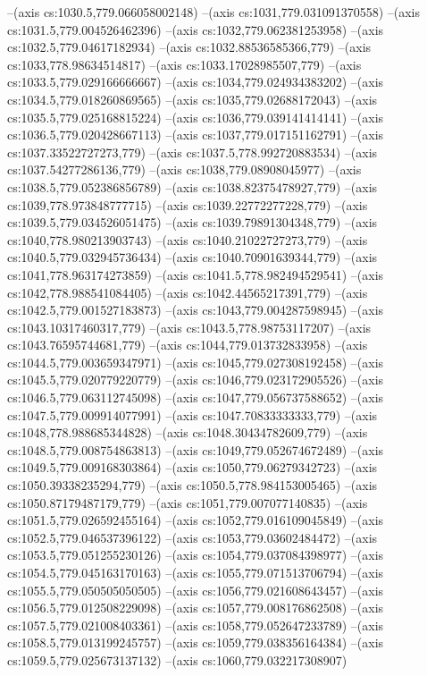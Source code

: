 --(axis cs:1030.5,779.066058002148)
--(axis cs:1031,779.031091370558)
--(axis cs:1031.5,779.004526462396)
--(axis cs:1032,779.062381253958)
--(axis cs:1032.5,779.04617182934)
--(axis cs:1032.88536585366,779)
--(axis cs:1033,778.98634514817)
--(axis cs:1033.17028985507,779)
--(axis cs:1033.5,779.029166666667)
--(axis cs:1034,779.024934383202)
--(axis cs:1034.5,779.018260869565)
--(axis cs:1035,779.02688172043)
--(axis cs:1035.5,779.025168815224)
--(axis cs:1036,779.039141414141)
--(axis cs:1036.5,779.020428667113)
--(axis cs:1037,779.017151162791)
--(axis cs:1037.33522727273,779)
--(axis cs:1037.5,778.992720883534)
--(axis cs:1037.54277286136,779)
--(axis cs:1038,779.08908045977)
--(axis cs:1038.5,779.052386856789)
--(axis cs:1038.82375478927,779)
--(axis cs:1039,778.973848777715)
--(axis cs:1039.22772277228,779)
--(axis cs:1039.5,779.034526051475)
--(axis cs:1039.79891304348,779)
--(axis cs:1040,778.980213903743)
--(axis cs:1040.21022727273,779)
--(axis cs:1040.5,779.032945736434)
--(axis cs:1040.70901639344,779)
--(axis cs:1041,778.963174273859)
--(axis cs:1041.5,778.982494529541)
--(axis cs:1042,778.988541084405)
--(axis cs:1042.44565217391,779)
--(axis cs:1042.5,779.001527183873)
--(axis cs:1043,779.004287598945)
--(axis cs:1043.10317460317,779)
--(axis cs:1043.5,778.98753117207)
--(axis cs:1043.76595744681,779)
--(axis cs:1044,779.013732833958)
--(axis cs:1044.5,779.003659347971)
--(axis cs:1045,779.027308192458)
--(axis cs:1045.5,779.020779220779)
--(axis cs:1046,779.023172905526)
--(axis cs:1046.5,779.063112745098)
--(axis cs:1047,779.056737588652)
--(axis cs:1047.5,779.009914077991)
--(axis cs:1047.70833333333,779)
--(axis cs:1048,778.988685344828)
--(axis cs:1048.30434782609,779)
--(axis cs:1048.5,779.008754863813)
--(axis cs:1049,779.052674672489)
--(axis cs:1049.5,779.009168303864)
--(axis cs:1050,779.06279342723)
--(axis cs:1050.39338235294,779)
--(axis cs:1050.5,778.984153005465)
--(axis cs:1050.87179487179,779)
--(axis cs:1051,779.007077140835)
--(axis cs:1051.5,779.026592455164)
--(axis cs:1052,779.016109045849)
--(axis cs:1052.5,779.046537396122)
--(axis cs:1053,779.03602484472)
--(axis cs:1053.5,779.051255230126)
--(axis cs:1054,779.037084398977)
--(axis cs:1054.5,779.045163170163)
--(axis cs:1055,779.071513706794)
--(axis cs:1055.5,779.050505050505)
--(axis cs:1056,779.021608643457)
--(axis cs:1056.5,779.012508229098)
--(axis cs:1057,779.008176862508)
--(axis cs:1057.5,779.021008403361)
--(axis cs:1058,779.052647233789)
--(axis cs:1058.5,779.013199245757)
--(axis cs:1059,779.038356164384)
--(axis cs:1059.5,779.025673137132)
--(axis cs:1060,779.032217308907)
